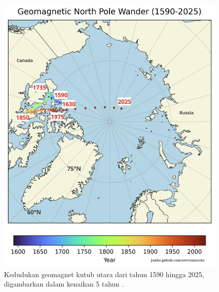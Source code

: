 \documentclass[10pt,twocolumn,letterpaper]{article}
\begin{document}
\begin{figure}[t]
\begin{center}
   \includegraphics[width=1\linewidth]{npw.jpg}
\end{center}

   \caption{Kedudukan geomagnet kutub utara dari tahun 1590 hingga 2025, digambarkan dalam kenaikan 5 tahun \cite{142}.}
\label{fig:13}
\label{fig:onecol}
\end{figure}
\end{document}
